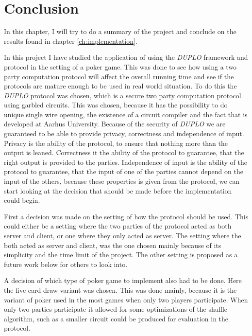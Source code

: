 \documentclass[twoside,11pt,openright]{report}
\newcommand{\DUPLO}{\textit{DUPLO} }
\begin{document}

\chapter{Conclusion}
\label{ch:conclution}

In this chapter, I will try to do a summary of the project and conclude on the results found in chapter \ref{ch:implementation}.

In this project I have studied the application of using the \DUPLO framework and protocol in the setting of a poker game. This was done to see how using a two party computation protocol will affect the overall running time and see if the protocols are mature enough to be used in real world situation. To do this the \DUPLO protocol was chosen, which is a secure two party computation protocol using garbled circuits. This was chosen, because it has the possibility to do unique single wire opening, the existence of a circuit compiler and the fact that is developed at Aarhus University. Because of the security of \DUPLO we are guaranteed to be able to provide privacy, correctness and independence of input. Privacy is the ability of the protocol, to ensure that nothing more than the output is leaned. Correctness it the ability of the protocol to guarantee, that the right output is provided to the parties. Independence of input is the ability of the protocol to guarantee, that the input of one of the parties cannot depend on the input of the others, because these properties is given from the protocol, we can start looking at the decision that should be made before the implementation could begin.

First a decision was made on the setting of how the protocol should be used. This could either be a setting where the two parties of the protocol acted as both server and client, or one where they only acted as server. The setting where the both acted as server and client, was the one chosen mainly because of its simplicity and the time limit of the project. The other setting is proposed as a future work below for others to look into.

A decision of which type of poker game to implement also had to be done. Here the five card draw variant was chosen. This was done mainly, because it is the variant of poker used in the most games when only two players participate. When only two parties participate it allowed for some optimizations of the shuffle algorithm, such as a smaller circuit could be produced for evaluation in the protocol.
\end{document}
